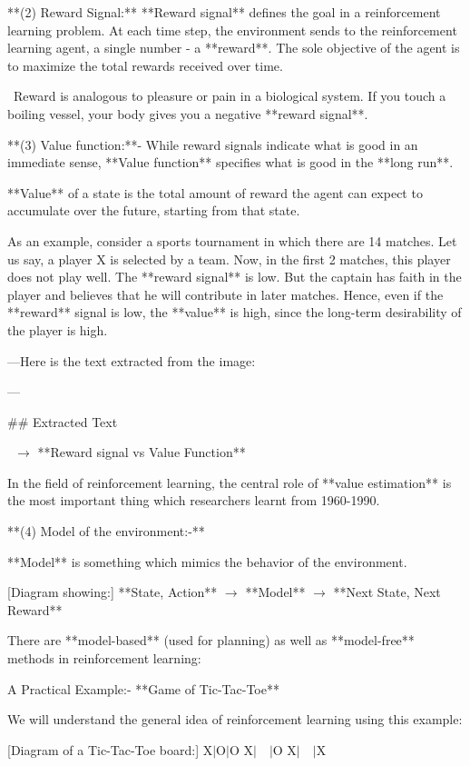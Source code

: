 **(2) Reward Signal:** **Reward signal** defines the goal in a reinforcement learning problem. At each time step, the environment sends to the reinforcement learning agent, a single number - a **reward**. The sole objective of the agent is to maximize the total rewards received over time.

 Reward is analogous to pleasure or pain in a biological system. If you touch a boiling vessel, your body gives you a negative **reward signal**.

**(3) Value function:**- While reward signals indicate what is good in an immediate sense, **Value function** specifies what is good in the **long run**.

**Value** of a state is the total amount of reward the agent can expect to accumulate over the future, starting from that state.

As an example, consider a sports tournament in which there are 14 matches. Let us say, a player $\text{X}$ is selected by a team. Now, in the first 2 matches, this player does not play well. The **reward signal** is low. But the captain has faith in the player and believes that he will contribute in later matches. Hence, even if the **reward** signal is low, the **value** is high, since the long-term desirability of the player is high.

---Here is the text extracted from the image:

---

## Extracted Text

 $\to$ **Reward signal vs Value Function**

In the field of reinforcement learning, the central role of **value estimation** is the most important thing which researchers learnt from 1960-1990.

**(4) Model of the environment:-**

**Model** is something which mimics the behavior of the environment.

[Diagram showing:] **State, Action** $\to$ **Model** $\to$ **Next State, Next Reward**

There are **model-based** (used for planning) as well as **model-free** methods in reinforcement learning:

A Practical Example:- **Game of Tic-Tac-Toe**

We will understand the general idea of reinforcement learning using this example:

[Diagram of a Tic-Tac-Toe board:]
$\text{X}|\text{O}|\text{O}$
$\text{X}|\quad|\text{O}$
$\text{X}|\quad|\text{X}$

